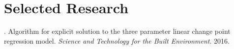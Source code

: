 \documentclass[]{deedy-resume-openfont}
\begin{document}
\begin{minipage}[t]{0.66\textwidth}



\section{Selected Research}

. Algorithm for explicit solution to the three
parameter linear change point regression model. \textit{Science and Technology
for the Built Environment}. 2016.


\sectionsep


\end{minipage}
\end{document}

